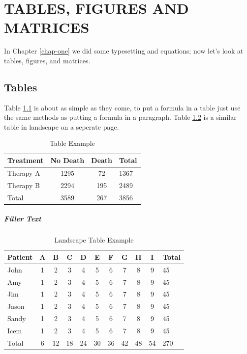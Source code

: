 \chapter{TABLES, FIGURES AND MATRICES}
\label{chap-two}
In Chapter \ref{chap-one} we did some typesetting and equations; now let's 
look at tables, figures, and matrices.

\section{Tables}
Table \ref{tab:one} is about as simple as they come, to put a formula in a 
table just use the same methods as putting a formula in a paragraph.  
Table \ref{tab:two} is a similar table in landscape on a seperate page.  
%
\begin{table}
\caption{Table Example}
\label{tab:one}
\begin{center}
\begin{tabular}{lccl}
\toprule
Treatment & No Death & Death & Total\\
\midrule
Therapy A & 1295 & 72 & 1367\\
Therapy B 	& 2294 & 195 & 2489\\
\midrule
Total & 3589 & 267 & 3856\\
\bottomrule
\end{tabular}
\end{center}
\end{table}

\paragraph{Filler Text} \lipsum[1-2]

\thispagestyle{lscapedplain}
\begin{landscape}
\begin{table}
\caption{Landscape Table Example}
\label{tab:two}
\begin{center}
\begin{tabular}{lcccccccccl}
\toprule
Patient & A & B & C & D & E & F & G & H &I & Total \\
\midrule
John & 1 & 2 & 3 & 4 & 5 & 6 & 7 & 8 & 9 & 45 \\
Amy & 1 & 2 & 3 & 4 & 5 & 6 & 7 & 8 & 9 & 45 \\
Jim & 1 & 2 & 3 & 4 & 5 & 6 & 7 & 8 & 9 & 45 \\
Jason & 1 & 2 & 3 & 4 & 5 & 6 & 7 & 8 & 9 & 45 \\
Sandy & 1 & 2 & 3 & 4 & 5 & 6 & 7 & 8 & 9 & 45 \\
Icem & 1 & 2 & 3 & 4 & 5 & 6 & 7 & 8 & 9 & 45 \\
\midrule
Total & 6 & 12 & 18 & 24 & 30 & 36 & 42 & 48 & 54 & 270\\
\bottomrule
\end{tabular}
\end{center}
\end{table}
\end{landscape}
\restoregeometry
\pagestyle{plain}
\thispagestyle{plain}



